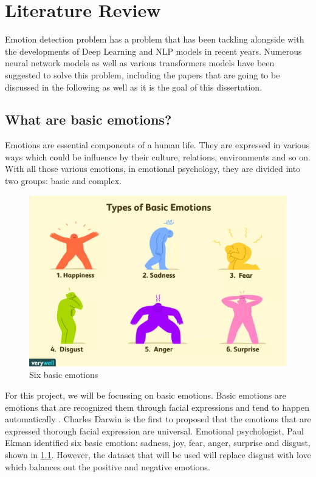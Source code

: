 
\chapter{Literature Review}

Emotion detection problem has a problem that has been tackling alongside with the developments of Deep Learning and NLP models in recent years. 
Numerous neural network models as well as various transformers models have been suggested to solve this problem, including the papers that are going to be discussed in the following as well as it is the goal of this dissertation.

\section{What are basic emotions?}
Emotions are essential components of a human life. They are expressed in various ways which could be influence by their culture, relations, environments and so on. With all those various emotions, in emotional psychology, they are divided into two groups: basic and complex.

\begin{figure}[ht]
    \centerline{\includegraphics[scale=0.75]{Figures/six_emotions.png}}
    \caption{Six basic emotions}
    \label{fig:emotions}
 \end{figure}

For this project, we will be focussing on basic emotions. Basic emotions are emotions that are recognized them through facial expressions and tend to happen automatically \cite{Uwa_2023}. Charles Darwin is the first to proposed that the emotions that are expressed thorough facial expression are universal. Emotional psychologist, Paul Ekman identified six basic emotion: sadness, joy, fear, anger, surprise and disgust, shown in \ref{fig:emotions}. However, the dataset that will be used will replace disgust with love which balances out the positive and negative emotions.

